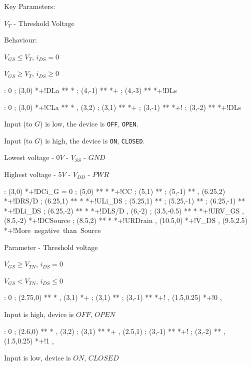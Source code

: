 \documentclass[a4paper,12pt]{article}
\begin{document}
Key Parameters:

$V_{T}$ - Threshold Voltage

Behaviour:

$V_{GS} \leq V_{T}$, $i_{DS} = 0$

$V_{GS} \geq V_{T}$, $i_{DS} \geq 0$

\begin{table}[h]

\xy <1cm,0cm>:
0 ; (3,0) *+!DL{a} **\dir{-} *\dir{>} ; 
(4,-1) **\dir{-} *+{\circ} ;
(4,-3) **\dir{-} *+!DL{s}
\endxy

\end{table}



\begin{table}[h]

\xy <1cm,0cm>:
0 ; (3,0) *+!CL{a} **\dir{-} *\dir{>} ,
(3,2) ; (3,1) **\dir{-} *+{\circ} ;
(3,-1) **\dir{-} *+!{\circ} ;
(3,-2) **\dir{-} *+!DL{s}
\endxy

\end{table}

Input (to $G$) is low, the device is \verb!OFF!, \verb!OPEN!.

Input (to $G$) is high, the device is \verb!ON!, \verb!CLOSED!.


Lowest voltage - $0V$ - $V_{SS}$ - $GND$

Highest voltage - $5V$ - $V_{DD}$ - $PWR$

\begin{table}[h]

\xy <1cm,0cm>:
(3,0) *+!DC{i_{G} = 0} ; (5,0) **\dir{-} *\dir{>} *+!CC{\bullet} ;
(5,1) **\dir{-} ; (5,-1) **\dir{-} ,
(6.25,2) *+!DR{S/D} ; 
(6.25,1) **\dir{-} *\dir{>} *+!UL{i_{DS}} ;
(5.25,1) **\dir{-} ;
(5.25,-1) **\dir{-} ;
(6.25,-1) **\dir{-} *+!DL{i_{DS}} ;
(6.25,-2) **\dir{-} *\dir{>} *+!DL{S/D} ,
(6,-2) ; (3.5,-0.5) ** *\dir{<} *+!UR{V_{GS}} ,
(8.5,-2) *+!DC{Source} ; (8.5,2) ** *\dir{>} *+!UR{Drain} ,
(10.5,0) *+!{V_{DS} } ,
(9.5,2.5) *+!{\mbox{More negative than Source}}
\endxy


\end{table}

Parameter - Threshold voltage

$V_{GS} \geq V_{TN}$, $i_{DS} = 0$

$V_{GS} < V_{TN}$, $i_{DS} \leq 0$

\begin{table}[h]

\xy <1cm,0cm>:
0 ; (2.75,0) **\dir{-} *\dir{>} ,
(3,1) *+{\circ} ; (3,1) **\dir{-} ; (3,-1) **\dir{-} *+!{\circ} ,
(1.5,0.25) *+!{0} ,
\endxy

\caption{Input is high, device is $OFF$, $OPEN$}

\end{table}

\begin{table}[h]

\xy <1cm,0cm>:
0 ; (2.6,0) **\dir{-} *\dir{>} ,
(3,2) ; (3,1) **\dir{-} *+{\circ} ,
(2.5,1) ; (3,-1) **\dir{-} *+!{\circ} ;
(3,-2) **\dir{-} ,
(1.5,0.25) *+!{1} ,
\endxy

\caption{Input is low, device is $ON$, $CLOSED$}

\end{table}
\end{document}
